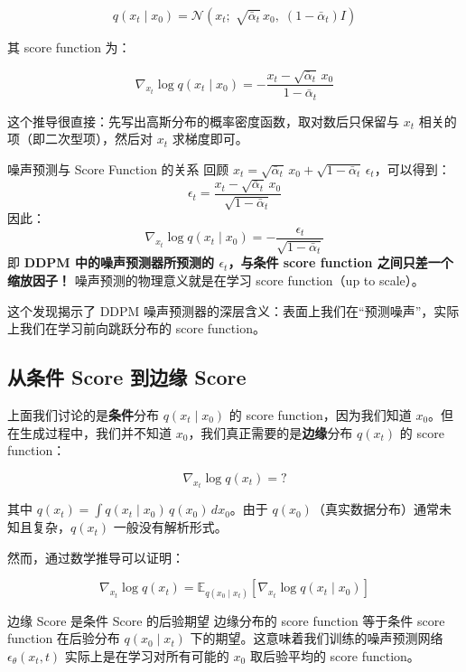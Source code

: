\documentclass[a4paper]{article}
\begin{document}
$$q(x_t \mid x_0) = \mathcal{N}(x_t;\; \sqrt{\bar{\alpha}_t}\, x_0,\; (1-\bar{\alpha}_t) I)$$

其 score function 为：

$$\nabla_{x_t} \log q(x_t \mid x_0) = -\frac{x_t - \sqrt{\bar{\alpha}_t}\, x_0}{1-\bar{\alpha}_t}$$

这个推导很直接：先写出高斯分布的概率密度函数，取对数后只保留与 $x_t$ 相关的项（即二次型项），然后对 $x_t$ 求梯度即可。

\begin{importantbox}{噪声预测与 Score Function 的关系}
回顾 $x_t = \sqrt{\bar{\alpha}_t}\, x_0 + \sqrt{1-\bar{\alpha}_t}\, \epsilon_t$，可以得到：
$$\epsilon_t = \frac{x_t - \sqrt{\bar{\alpha}_t}\, x_0}{\sqrt{1-\bar{\alpha}_t}}$$
因此：
$$\nabla_{x_t} \log q(x_t \mid x_0) = -\frac{\epsilon_t}{\sqrt{1-\bar{\alpha}_t}}$$
即 \textbf{DDPM 中的噪声预测器所预测的 $\epsilon_t$，与条件 score function 之间只差一个缩放因子！} 噪声预测的物理意义就是在学习 score function（up to scale）。
\end{importantbox}

这个发现揭示了 DDPM 噪声预测器的深层含义：表面上我们在``预测噪声''，实际上我们在学习前向跳跃分布的 score function。

\subsection{从条件 Score 到边缘 Score}

上面我们讨论的是\textbf{条件}分布 $q(x_t \mid x_0)$ 的 score function，因为我们知道 $x_0$。但在生成过程中，我们并不知道 $x_0$，我们真正需要的是\textbf{边缘}分布 $q(x_t)$ 的 score function：

$$\nabla_{x_t} \log q(x_t) = ?$$

其中 $q(x_t) = \int q(x_t \mid x_0)\, q(x_0)\, dx_0$。由于 $q(x_0)$（真实数据分布）通常未知且复杂，$q(x_t)$ 一般没有解析形式。

然而，通过数学推导可以证明：

$$\nabla_{x_t} \log q(x_t) = \mathbb{E}_{q(x_0 \mid x_t)}\left[\nabla_{x_t} \log q(x_t \mid x_0)\right]$$

\begin{importantbox}{边缘 Score 是条件 Score 的后验期望}
边缘分布的 score function 等于条件 score function 在后验分布 $q(x_0 \mid x_t)$ 下的期望。这意味着我们训练的噪声预测网络 $\epsilon_\theta(x_t, t)$ 实际上是在学习对所有可能的 $x_0$ 取后验平均的 score function。
\end{importantbox}
\end{document}
